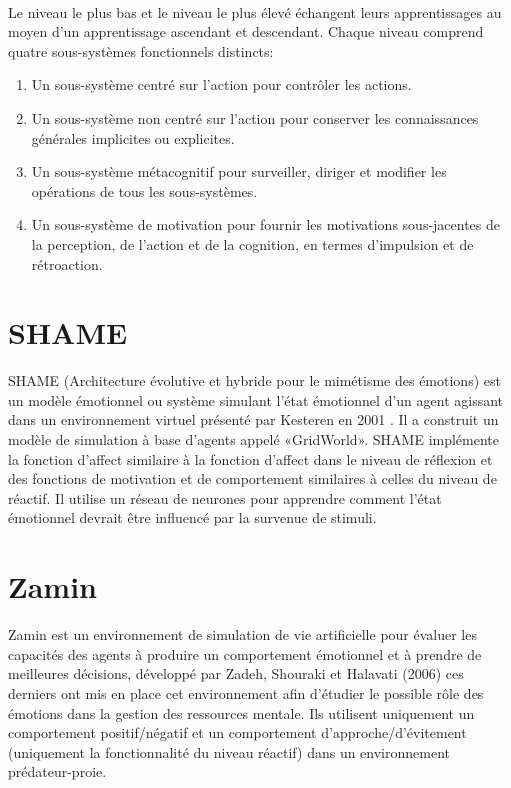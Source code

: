 ~\par
Le niveau le plus bas et le niveau le plus élevé échangent leurs apprentissages au moyen d'un apprentissage ascendant et descendant. Chaque niveau comprend quatre sous-systèmes fonctionnels distincts:

\begin{enumerate}
\item Un sous-système centré sur l'action pour contrôler les actions.
\item Un sous-système non centré sur l'action pour conserver les connaissances générales implicites ou explicites.
\item Un sous-système métacognitif pour surveiller, diriger et modifier les opérations de tous les sous-systèmes.
\item Un sous-système de motivation pour fournir les motivations sous-jacentes de la perception, de l'action et de la cognition, en termes d'impulsion et de rétroaction.
\end{enumerate}

\section{SHAME}

SHAME (Architecture évolutive et hybride pour le mimétisme des émotions) est un modèle émotionnel ou système simulant l'état émotionnel d'un agent agissant dans un environnement virtuel présenté par Kesteren en 2001 \parencite{kesteren2001supervised}. Il a construit un modèle de simulation à base d'agents appelé «GridWorld». SHAME implémente la fonction d’affect similaire à la fonction d’affect dans le niveau de réflexion et des fonctions de motivation et de comportement similaires à celles du niveau de réactif. Il utilise un réseau de neurones pour apprendre comment l'état émotionnel devrait être influencé par la survenue de stimuli.


\section{Zamin}

Zamin est un environnement de simulation de vie artificielle pour évaluer les capacités des agents à produire un comportement émotionnel et à prendre de meilleures décisions, développé par Zadeh, Shouraki et Halavati (2006) \parencite{zadeh2006emotional} ces derniers ont mis en place cet environnement afin d’étudier le possible rôle des émotions dans la gestion des ressources mentale. Ils utilisent uniquement un comportement positif/négatif et un comportement d'approche/d'évitement (uniquement la fonctionnalité du niveau réactif) dans un environnement prédateur-proie.
